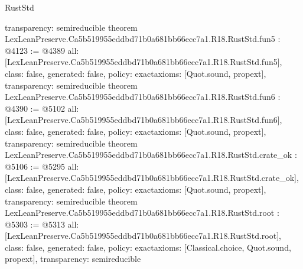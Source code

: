 \begin{lexlean}{RustStd}
\begin{coremodule}
{  transparency: semireducible
}
theorem LexLeanPreserve.Ca5b519955eddbd71b0a681bb66ecc7a1.R18.RustStd.fun5 : @4123 := @4389 {
  all: [LexLeanPreserve.Ca5b519955eddbd71b0a681bb66ecc7a1.R18.RustStd.fun5],
  class: false,
  generated: false,
  policy: exact{axioms: [Quot.sound, propext]},
  transparency: semireducible
}
theorem LexLeanPreserve.Ca5b519955eddbd71b0a681bb66ecc7a1.R18.RustStd.fun6 : @4390 := @5102 {
  all: [LexLeanPreserve.Ca5b519955eddbd71b0a681bb66ecc7a1.R18.RustStd.fun6],
  class: false,
  generated: false,
  policy: exact{axioms: [Quot.sound, propext]},
  transparency: semireducible
}
theorem LexLeanPreserve.Ca5b519955eddbd71b0a681bb66ecc7a1.R18.RustStd.crate_ok : @5106 := @5295 {
  all: [LexLeanPreserve.Ca5b519955eddbd71b0a681bb66ecc7a1.R18.RustStd.crate_ok],
  class: false,
  generated: false,
  policy: exact{axioms: [Quot.sound, propext]},
  transparency: semireducible
}
theorem LexLeanPreserve.Ca5b519955eddbd71b0a681bb66ecc7a1.R18.RustStd.root : @5303 := @5313 {
  all: [LexLeanPreserve.Ca5b519955eddbd71b0a681bb66ecc7a1.R18.RustStd.root],
  class: false,
  generated: false,
  policy: exact{axioms: [Classical.choice, Quot.sound, propext]},
  transparency: semireducible
}


\end{coremodule}
\end{lexlean}
